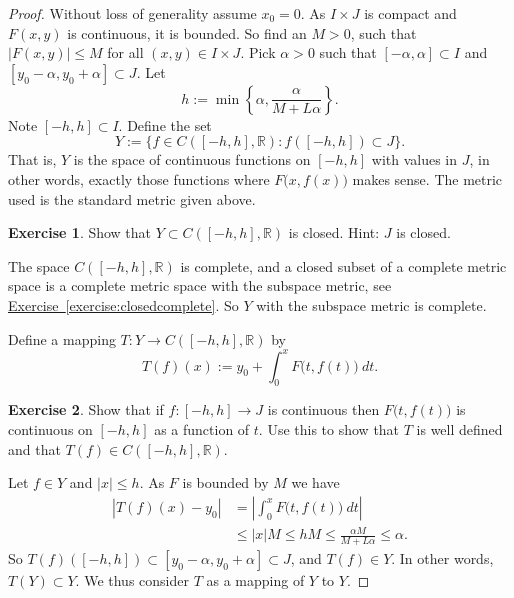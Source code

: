 \documentclass[12pt]{book}
\newcommand{\abs}[1]{\left\lvert {#1} \right\rvert}
\newcommand{\R}{{\mathbb{R}}}
\theoremstyle{plain}
\theoremstyle{remark}
\theoremstyle{definition}
\theoremstyle{exercise}
\newtheorem{exercise}{Exercise}[section]
\theoremstyle{example}
\newcommand{\exerciseref}[1]{\hyperref[#1]{Exercise~\ref*{#1}}}
\begin{document}
\begin{proof}
Without loss of generality assume $x_0 =0$.
As $I \times J$ is compact and
$F(x,y)$ is continuous, it is bounded.
So find an $M > 0$, such that
$\abs{F(x,y)} \leq M$ for all $(x,y) \in I\times J$.
Pick $\alpha > 0$ such that
$[-\alpha,\alpha] \subset I$ and $[y_0-\alpha, y_0 + \alpha] \subset J$.
Let
\begin{equation*}
h := \min \left\{ \alpha, \frac{\alpha}{M+L\alpha} \right\} .
\end{equation*}
Note $[-h,h] \subset I$.  Define the set
\begin{equation*}
Y := \{ f \in C([-h,h],\R) : f([-h,h]) \subset J \} .
\end{equation*}
That is, $Y$ is the space of continuous functions on $[-h,h]$ with values in
$J$, in other words,
exactly those functions where $F\bigl(x,f(x)\bigr)$ makes sense.
The metric used is the standard metric given above.

\begin{exercise}
Show that $Y \subset C([-h,h],\R)$ is closed.  Hint: $J$ is closed.
\end{exercise}

The space $C([-h,h],\R)$ is complete, and
a closed subset of a complete metric space is a complete metric space with
the subspace metric, see \exerciseref{exercise:closedcomplete}.  So $Y$ with the subspace metric is
complete.

Define a mapping
$T \colon Y \to C([-h,h],\R)$ by
\begin{equation*}
T(f)(x)
:=
y_0 + \int_0^x F\bigl(t,f(t)\bigr)~dt .
\end{equation*}

\begin{exercise}
Show that if $f \colon [-h,h] \to J$ is continuous then $F\bigl(t,f(t)\bigr)$
is continuous on $[-h,h]$ as a function of $t$.  Use this to show that
$T$ is well defined and that $T(f) \in C([-h,h],\R)$.
\end{exercise}

Let $f \in Y$ and $\abs{x} \leq h$.
As $F$ is bounded by $M$ we have
\begin{equation*}
\begin{split}
\abs{T(f)(x) - y_0}
&= \abs{\int_0^x F\bigl(t,f(t)\bigr)~dt} \\
& \leq 
\abs{x}M \leq hM \leq \frac{\alpha M}{M+ L\alpha} \leq \alpha .
\end{split}
\end{equation*}
So $T(f)([-h,h]) \subset [y_0-\alpha,y_0+\alpha] \subset J$, and
$T(f) \in Y$.  In other words, $T(Y) \subset Y$.  We thus consider
$T$ as a mapping of $Y$ to $Y$.


\end{proof}
\end{document}
